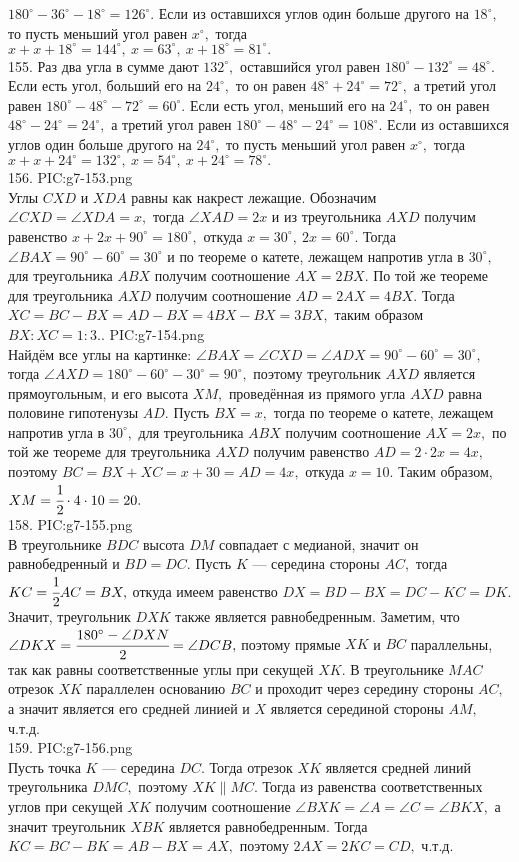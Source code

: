 $180^\circ-36^\circ-18^\circ=126^\circ.$ Если из оставшихся углов один больше другого на $18^\circ,$ то пусть меньший угол равен $x^\circ,$ тогда
$x+x+18^\circ=144^\circ,\ x=63^\circ,\ x+18^\circ=81^\circ.$\\
155. Раз два угла в сумме дают $132^\circ,$ оставшийся угол равен $180^\circ-132^\circ=48^\circ.$ Если есть угол, больший его на $24^\circ,$ то он равен $48^\circ+24^\circ=72^\circ,$ а третий угол равен $180^\circ-48^\circ-72^\circ=60^\circ.$ Если есть угол, меньший его на $24^\circ,$ то он равен $48^\circ-24^\circ=24^\circ,$ а третий угол равен
$180^\circ-48^\circ-24^\circ=108^\circ.$ Если из оставшихся углов один больше другого на $24^\circ,$ то пусть меньший угол равен $x^\circ,$ тогда
$x+x+24^\circ=132^\circ,\ x=54^\circ,\ x+24^\circ=78^\circ.$\\
156. {{PIC:g7-153.png}}\\
Углы $CXD$ и $XDA$ равны как накрест лежащие. Обозначим $\angle CXD=\angle XDA=x,$ тогда $\angle XAD=2x$ и из треугольника $AXD$ получим равенство $x+2x+90^\circ=180^\circ,$ откуда $x=30^\circ,\ 2x=60^\circ.$ Тогда $\angle BAX=90^\circ-60^\circ=30^\circ$ и по теореме о катете, лежащем напротив угла в $30^\circ,$ для треугольника $ABX$ получим соотношение $AX=2BX.$ По той же теореме для треугольника $AXD$ получим соотношение $AD=2AX=4BX.$ Тогда $XC=BC-BX=AD-BX=4BX-BX=3BX,$ таким образом $BX:XC=1:3.$\newpage{}. {{PIC:g7-154.png}}\\
Найдём все углы на картинке: $\angle BAX=\angle CXD=\angle ADX=90^\circ-60^\circ=30^\circ,$ тогда $\angle AXD=180^\circ-60^\circ-30^\circ=90^\circ,$ поэтому треугольник $AXD$ является прямоугольным, и его высота $XM,$ проведённая из прямого угла $AXD$ равна половине гипотенузы $AD.$ Пусть $BX=x,$ тогда по теореме о катете, лежащем напротив угла в $30^\circ,$ для треугольника $ABX$ получим соотношение $AX=2x,$ по той же теореме для треугольника $AXD$ получим равенство $AD=2\cdot2x=4x,$ поэтому $BC=BX+XC=x+30=AD=4x,$ откуда $x=10.$ Таким образом, $XM=\cfrac{1}{2}\cdot4\cdot10=20.$\\
158. {{PIC:g7-155.png}}\\
В треугольнике $BDC$ высота $DM$ совпадает с медианой, значит он равнобедренный и $BD=DC.$ Пусть $K$ --- середина стороны $AC,$ тогда $KC=\cfrac{1}{2} AC=BX,$ откуда имеем равенство $DX=BD-BX=DC-KC=DK.$ Значит, треугольник $DXK$ также является равнобедренным. Заметим, что $\angle DKX=\cfrac{180^\circ-\angle DXN}{2}=\angle DCB,$ поэтому прямые $XK$ и $BC$ параллельны, так как равны соответственные углы при секущей $XK.$ В треугольнике $MAC$ отрезок $XK$ параллелен основанию $BC$ и проходит через середину стороны $AC,$ а значит является его средней линией и $X$ является серединой стороны $AM,$ ч.т.д.\\
159. {{PIC:g7-156.png}}\\
Пусть точка $K$ --- середина $DC.$ Тогда отрезок $XK$ является средней линий треугольника $DMC,$ поэтому $XK\parallel MC.$ Тогда из равенства соответственных углов при секущей $XK$ получим соотношение $\angle BXK=\angle A=\angle C=\angle BKX,$ а значит треугольник $XBK$ является равнобедренным. Тогда $KC=BC-BK=AB-BX=AX,$ поэтому $2AX=2KC=CD,$ ч.т.д.

